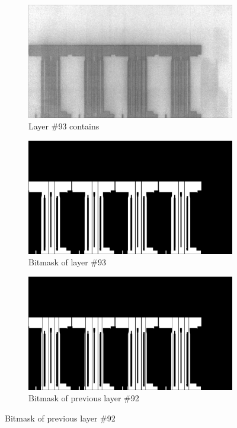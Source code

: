 
\begin{figure}[!h]
\centering
\begin{subfigure}{.8\textwidth}
  \centering
  \includegraphics[width=\linewidth]{images/implementation/results/bm/layer_00093}
  \caption{Layer \#93 contains}
\end{subfigure}

\begin{subfigure}{.8\textwidth}
  \centering
  \includegraphics[width=\linewidth]{images/implementation/results/bm/bitmask_00093}
  \caption{Bitmask of layer \#93}
\end{subfigure}

\begin{subfigure}{.8\textwidth}
  \centering
  \includegraphics[width=\linewidth]{images/implementation/results/bm/bitmask_00092}
  \caption{Bitmask of previous layer \#92}
\end{subfigure}


\end{figure}
